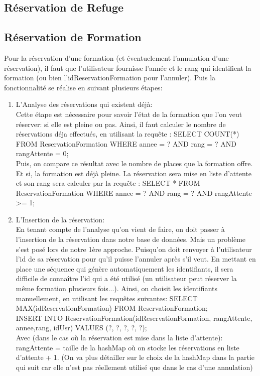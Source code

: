 \subsection{Réservation de Refuge}
\subsection{Réservation de Formation}
Pour la réservation d'une formation (et éventuelement l'annulation d'une réservation), il faut que l'utilisateur fournisse l'année et le rang qui identifient la formation (ou bien l'idReservationFormation pour l'annuler). Puis la fonctionnalité se réalise en suivant plusieurs étapes:
\begin{enumerate}
    \item L’Analyse des réservations qui existent déjà:\\
Cette étape est nécessaire pour savoir l'état de la formation que l'on veut réserver: si elle est pleine ou pas. Ainsi, il faut calculer le nombre de réservations déja effectués, en utilisant la requête : SELECT COUNT(*) FROM ReservationFormation WHERE annee = ? AND rang = ? AND rangAttente = 0;\\
Puis, on compare ce résultat avec le nombre de places que la formation offre. Et si, la formation est déjà pleine. La réservation sera mise en liste d'attente et son rang sera calculer par la requête : SELECT * FROM ReservationFormation WHERE annee = ? AND rang = ? AND rangAttente >= 1;\\

    \item L’Insertion de la réservation:\\
En tenant compte de l'analyse qu'on vient de faire, on doit passer à l'insertion de la réservation dans notre base de données. Mais un problème s'est posé lors de notre 1ère approche. Puisqu'on doit renvoyer à l'utilisateur l'id de sa réservation pour qu'il puisse l'annuler après s'il veut. En mettant en place une séquence qui génère automatiquement les identifiants, il sera difficile de connaître l'id qui a été utilisé (un utilisateur peut réserver la même formation plusieurs fois...). Ainsi, on choisit les identifiants manuellement, en utilisant les requêtes suivantes: SELECT MAX(idReservationFormation) FROM ReservationFormation;\\
INSERT INTO ReservationFormation(idReservationFormation, rangAttente, annee,rang, idUsr) VALUES (?, ?, ?, ?, ?);\\
Avec (dans le cas où la réservation est mise dans la liste d'attente): rangAttente = taille de la hashMap où on stocke les réservations en liste d'attente + 1. (On  va plus détailler sur le choix de la hashMap dans la partie qui suit car elle n'est pas réellement utilisé que dans le cas d'une annulation)


\end{enumerate}

